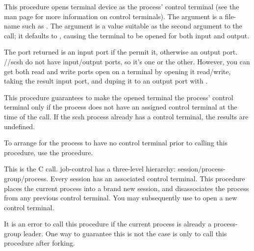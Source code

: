 \begin{desc}
This procedure opens terminal device  as the process'
control terminal 
(see the  man page for more information on control terminals).
The  argument is a file-name such as .
The  argument is a value suitable as the second argument
to the  call; it defaults to , causing
the terminal to be opened for both input and output.

The port returned is an input port if the  permit it, 
otherwise an output port. 
\RnRS/\scm/scsh do not have input/output ports,
so it's one or the other. 
However, you can get both read and write ports open on a terminal
by opening it read/write, taking the result input port,
and duping it to an output port with .

This procedure guarantees to make the opened terminal the
process' control terminal only if the process does not have
an assigned control terminal at the time of the call.
If the scsh process already has a control terminal, the results are undefined.

To arrange for the process to have no control terminal prior to calling
this procedure, use the  procedure.

\end{desc}

\begin{desc}
This is the C  call.
{\Posix} job-control has a three-level hierarchy:
session/process-group/process. 
Every session has an associated control terminal.
This procedure places the current process into a brand new session,
and disassociates the process from any previous control terminal.
You may subsequently use  to open a new control
terminal.

It is an error to call this procedure if the current process is already
a process-group leader.
One way to guarantee this is not the case is only to call this procedure
after forking.
\end{desc}


